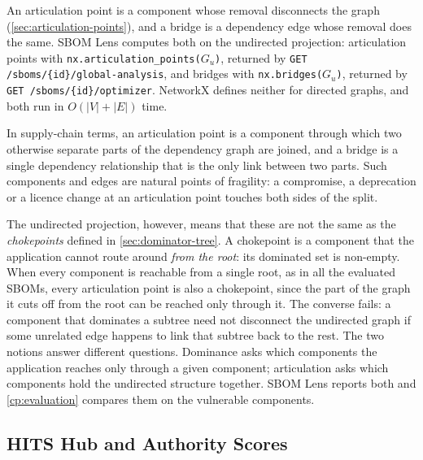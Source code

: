 An articulation point is a component whose removal disconnects the graph (\autoref{sec:articulation-points}), and a bridge is a dependency edge whose removal does the same. SBOM Lens computes both on the undirected projection: articulation points with \texttt{nx.articulation\_points(}\(G_u\)\texttt{)}, returned by \texttt{GET /sboms/\{id\}/global-analysis}, and bridges with \texttt{nx.bridges(}\(G_u\)\texttt{)}, returned by \texttt{GET /sboms/\{id\}/optimizer}. NetworkX defines neither for directed graphs, and both run in \(O(|V| + |E|)\) time.

In supply-chain terms, an articulation point is a component through which two otherwise separate parts of the dependency graph are joined, and a bridge is a single dependency relationship that is the only link between two parts. Such components and edges are natural points of fragility: a compromise, a deprecation or a licence change at an articulation point touches both sides of the split.

The undirected projection, however, means that these are not the same as the \textit{chokepoints} defined in \autoref{sec:dominator-tree}. A chokepoint is a component that the application cannot route around \emph{from the root}: its dominated set is non-empty. When every component is reachable from a single root, as in all the evaluated SBOMs, every articulation point is also a chokepoint, since the part of the graph it cuts off from the root can be reached only through it. The converse fails: a component that dominates a subtree need not disconnect the undirected graph if some unrelated edge happens to link that subtree back to the rest. The two notions answer different questions. Dominance asks which components the application reaches only through a given component; articulation asks which components hold the undirected structure together. SBOM Lens reports both and \autoref{cp:evaluation} compares them on the vulnerable components.


\subsection{HITS Hub and Authority Scores}
\label{sec:hits}


